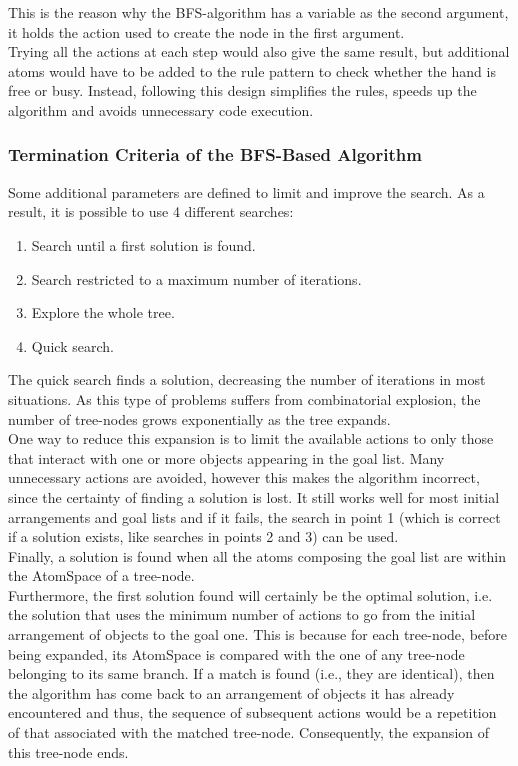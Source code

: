 This is the reason why the BFS-algorithm has a variable as the second argument, it holds the action used to create the node in the first argument. \\
Trying all the actions at each step would also give the same result, but additional atoms would have to be added to the rule pattern to check whether the hand is free or busy.
Instead, following this design simplifies the rules, speeds up the algorithm and avoids unnecessary code execution.


\subsubsection{Termination Criteria of the BFS-Based Algorithm}\label{sec:term_criteria}

Some additional parameters are defined to limit and improve the search. As a result, it is possible to use 4 different searches:

\begin{enumerate}
	\item Search until a first solution is found.
	\item Search restricted to a maximum number of iterations.
	\item Explore the whole tree.
	\item Quick search.
\end{enumerate}

The quick search finds a solution, decreasing the number of iterations in most situations.
As this type of problems suffers from combinatorial explosion\footnotemark{}, the number of tree-nodes grows exponentially as the tree expands.
 \\
One way to reduce this expansion is to limit the available actions to only those that interact with one or more objects appearing in the goal list.
Many unnecessary actions are avoided, however this makes the algorithm incorrect, since the certainty of finding a solution is lost.
It still works well for most initial arrangements and goal lists and if it fails, the search in point 1 (which is correct if a solution exists, like searches in points 2 and 3) can be used. \\

Finally, a solution is found when all the atoms composing the goal list are within the AtomSpace of a tree-node. \\
Furthermore, the first solution found will certainly be the optimal solution, i.e. the solution that uses the minimum number of actions to go from the initial arrangement of objects to the goal one.
This is because for each tree-node, before being expanded, its AtomSpace is compared with the one of any tree-node belonging to its same branch.
If a match is found (i.e., they are identical), then the algorithm has come back to an arrangement of objects it has already encountered and thus, the sequence of subsequent actions would be a repetition of that associated with the matched tree-node. Consequently, the expansion of this tree-node ends.


